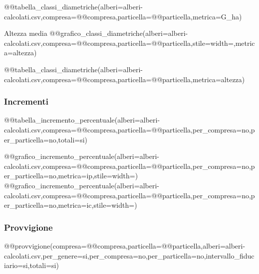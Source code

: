 {\begin{minipage}[t][][c]{0.5\textwidth}
\begin{flushright}
            @@tabella_classi_diametriche(alberi=alberi-calcolati.csv,compresa=@@compresa,particella=@@particella,metrica=G_ha)
        \end{flushright}
    \endgroup
\end{minipage}
\hfill
\begin{minipage}[t][][c]{0.5\textwidth}
    \noindent \textsf{Altezza media}
    @@grafico_classi_diametriche(alberi=alberi-calcolati.csv,compresa=@@compresa,particella=@@particella,stile=width=\textwidth,metrica=altezza)
    \begingroup
        \setlength{\LTleft}{0pt}
        \begin{flushright}
            @@tabella_classi_diametriche(alberi=alberi-calcolati.csv,compresa=@@compresa,particella=@@particella,metrica=altezza)
        \end{flushright}
    \endgroup
\end{minipage}

\subsubsection*{Incrementi}
\begin{minipage}[t][][t]{0.5\textwidth}
    \begingroup
        \setlength{\LTleft}{0pt}
        \vspace{-\baselineskip}
        \begin{flushleft}
            @@tabella_incremento_percentuale(alberi=alberi-calcolati.csv,compresa=@@compresa,particella=@@particella,per_compresa=no,per_particella=no,totali=si)
        \end{flushleft}
    \endgroup
\end{minipage}%
\hfill
\begin{minipage}[t][][c]{0.5\textwidth}
    \begin{flushright}
        @@grafico_incremento_percentuale(alberi=alberi-calcolati.csv,compresa=@@compresa,particella=@@particella,per_compresa=no,per_particella=no,metrica=ip,stile=width=\textwidth)
        \vspace*{1em}
        @@grafico_incremento_percentuale(alberi=alberi-calcolati.csv,compresa=@@compresa,particella=@@particella,per_compresa=no,per_particella=no,metrica=ic,stile=width=\textwidth)
    \end{flushright}
\end{minipage}

\subsubsection*{Provvigione}
@@provvigione(compresa=@@compresa,particella=@@particella,alberi=alberi-calcolati.csv,per_genere=si,per_compresa=no,per_particella=no,intervallo_fiduciario=si,totali=si)

}
